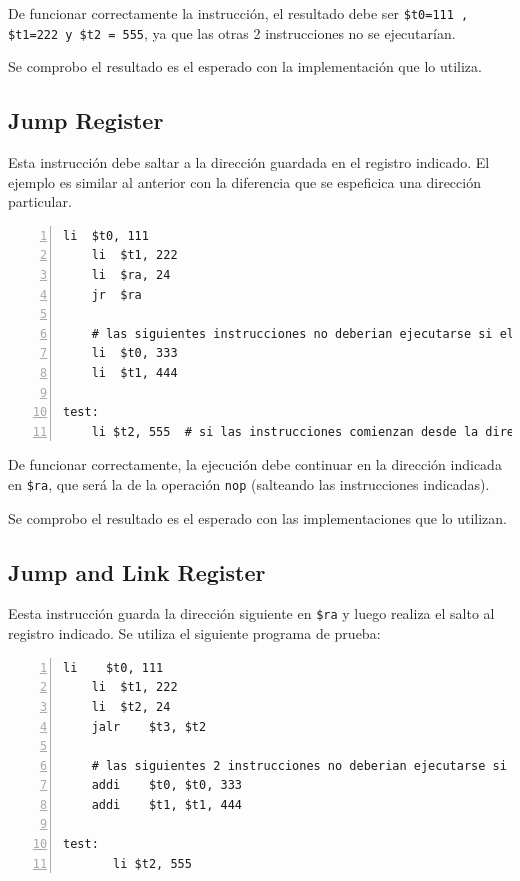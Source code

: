 \documentclass[11pt,a4paper, spanish]{article}
\begin{document}
De funcionar correctamente la instrucción, el resultado debe ser \texttt{\$t0=111 , \$t1=222 y \$t2 = 555}, ya que las otras 2 instrucciones no se ejecutarían.

Se comprobo el resultado es el esperado con la implementación que lo utiliza.

\subsection{Jump Register}

Esta instrucción debe saltar a la dirección guardada en el registro indicado. El ejemplo es similar al
anterior con la diferencia que se espeficica una dirección particular.

\begin{lstlisting}[numbers=left, tabsize=2, basicstyle=\fontsize{11}{13}\ttfamily, frame=single, caption={Test jr}]
	li	$t0, 111
	li	$t1, 222
	li	$ra, 24
	jr	$ra

	# las siguientes instrucciones no deberian ejecutarse si el salto se realiza
	li	$t0, 333
	li	$t1, 444

test:
	li $t2, 555  # si las instrucciones comienzan desde la dirección 0, esta tiene la dirección 24
\end{lstlisting}

De funcionar correctamente, la ejecución debe continuar en la dirección indicada en \texttt{\$ra}, que
será la de la operación \texttt{nop} (salteando las instrucciones indicadas).

Se comprobo el resultado es el esperado con las implementaciones que lo utilizan.

\subsection{Jump and Link Register}

Eesta instrucción guarda la dirección siguiente en \texttt{\$ra} y luego realiza el salto al registro
indicado. Se utiliza el siguiente programa de prueba:

\begin{lstlisting}[numbers=left, tabsize=2, basicstyle=\fontsize{11}{13}\ttfamily, frame=single, caption={Test jr}]
  li	$t0, 111
	li	$t1, 222
	li	$t2, 24
	jalr	$t3, $t2

	# las siguientes 2 instrucciones no deberian ejecutarse si el salto se realiza
	addi	$t0, $t0, 333
	addi	$t1, $t1, 444

test:
       li $t2, 555
\end{lstlisting}
\end{document}
